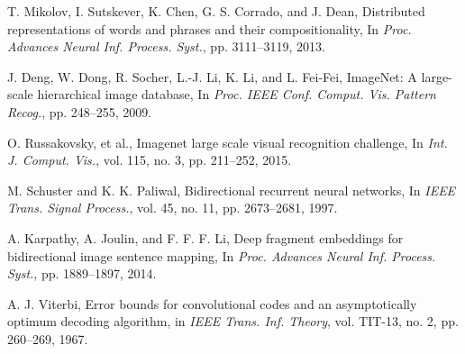 \documentclass[10pt,twocolumn,letterpaper]{article}
\begin{document}
\begin{thebibliography}{99}
T. Mikolov, I. Sutskever, K. Chen, G. S. Corrado, and J. Dean, Distributed representations of words and phrases and their compositionality,
In \textit{Proc. Advances Neural Inf. Process. Syst.}, pp. 3111–3119, 2013.

J. Deng, W. Dong, R. Socher, L.-J. Li, K. Li, and L. Fei-Fei, ImageNet: A large-scale hierarchical image database,
In \textit{Proc. IEEE Conf. Comput. Vis. Pattern Recog.}, pp. 248–255, 2009.

O. Russakovsky, et al., Imagenet large scale visual recognition challenge,
In \textit{Int. J. Comput. Vis.}, vol. 115, no. 3, pp. 211–252, 2015.

M. Schuster and K. K. Paliwal, Bidirectional recurrent neural networks,
In \textit{IEEE Trans. Signal Process.}, vol. 45, no. 11, pp. 2673–2681, 1997.

A. Karpathy, A. Joulin, and F. F. F. Li, Deep fragment embeddings for bidirectional image sentence mapping,
In \textit{Proc. Advances Neural Inf. Process. Syst.}, pp. 1889–1897, 2014.

A. J. Viterbi, Error bounds for convolutional codes and an asymptotically optimum decoding algorithm,
in \textit{IEEE Trans. Inf. Theory}, vol. TIT-13, no. 2, pp. 260–269, 1967.

\end{thebibliography}
\end{document}
